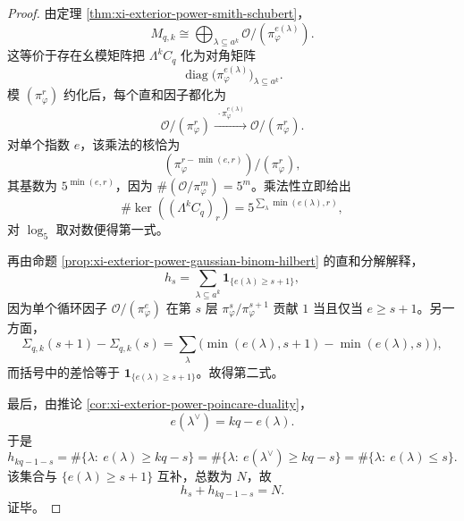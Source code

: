 \begin{proof}
由定理 \ref{thm:xi-exterior-power-smith-schubert}，
\[
M_{q,k}\cong \bigoplus_{\lambda\subseteq a^k}\mathcal O/(\pi_\varphi^{e(\lambda)}).
\]
这等价于存在幺模矩阵把 \(\Lambda^k C_q\) 化为对角矩阵
\[
\operatorname{diag}\bigl(\pi_\varphi^{e(\lambda)}\bigr)_{\lambda\subseteq a^k}.
\]
模 \((\pi_\varphi^r)\) 约化后，每个直和因子都化为
\[
\mathcal O/(\pi_\varphi^r)\xrightarrow{\ \cdot \pi_\varphi^{e(\lambda)}\ }\mathcal O/(\pi_\varphi^r).
\]
对单个指数 \(e\)，该乘法的核恰为
\[
(\pi_\varphi^{r-\min(e,r)})/(\pi_\varphi^r),
\]
其基数为 \(5^{\min(e,r)}\)，因为 \(\#(\mathcal O/\pi_\varphi^m)=5^m\)。乘法性立即给出
\[
\#\ker((\Lambda^k C_q)_r)
=
5^{\sum_{\lambda}\min(e(\lambda),r)},
\]
对 \(\log_5\) 取对数便得第一式。

再由命题 \ref{prop:xi-exterior-power-gaussian-binom-hilbert} 的直和分解解释，
\[
h_s=\sum_{\lambda\subseteq a^k}\mathbf 1_{\{e(\lambda)\ge s+1\}},
\]
因为单个循环因子 \(\mathcal O/(\pi_\varphi^e)\) 在第 \(s\) 层
\(
\pi_\varphi^s/\pi_\varphi^{s+1}
\)
贡献 \(1\) 当且仅当 \(e\ge s+1\)。另一方面，
\[
\Sigma_{q,k}(s+1)-\Sigma_{q,k}(s)
=
\sum_{\lambda}
\bigl(\min(e(\lambda),s+1)-\min(e(\lambda),s)\bigr),
\]
而括号中的差恰等于 \(\mathbf 1_{\{e(\lambda)\ge s+1\}}\)。故得第二式。

最后，由推论 \ref{cor:xi-exterior-power-poincare-duality}，
\[
e(\lambda^\vee)=kq-e(\lambda).
\]
于是
\[
h_{kq-1-s}
=
\#\{\lambda:\ e(\lambda)\ge kq-s\}
=
\#\{\lambda:\ e(\lambda^\vee)\ge kq-s\}
=
\#\{\lambda:\ e(\lambda)\le s\}.
\]
该集合与 \(\{e(\lambda)\ge s+1\}\) 互补，总数为 \(N\)，故
\[
h_s+h_{kq-1-s}=N.
\]
证毕。
\end{proof}

